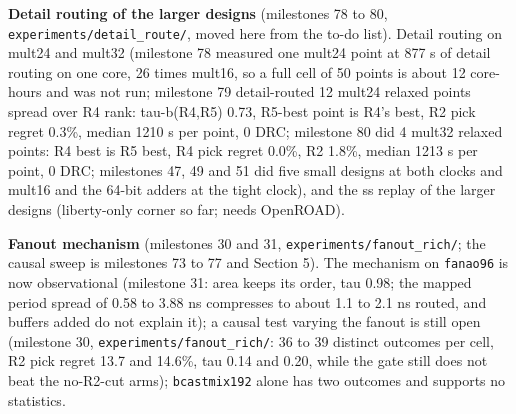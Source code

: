 \documentclass[conference]{IEEEtran}
\begin{document}
\textbf{Detail routing of the larger designs} (milestones 78 to 80,
\texttt{experiments/\allowbreak{}detail\_\allowbreak{}route/\allowbreak{}}, moved here from the to-do list).
Detail routing on mult24 and mult32 (milestone 78 measured one mult24
point at 877 s of detail routing on one core, 26 times mult16, so a full
cell of 50 points is about 12 core-hours and was not run; milestone 79
detail-routed 12 mult24 relaxed points spread over R4 rank: tau-b(R4,R5)
0.73, R5-best point is R4's best, R2 pick regret 0.3\%, median 1210 s
per point, 0 DRC; milestone 80 did 4 mult32 relaxed points: R4 best is
R5 best, R4 pick regret 0.0\%, R2 1.8\%, median 1213 s per point, 0 DRC;
milestones 47, 49 and 51 did five small designs at both clocks and
mult16 and the 64-bit adders at the tight clock), and the ss replay of
the larger designs (liberty-only corner so far; needs OpenROAD).

\textbf{Fanout mechanism} (milestones 30 and 31,
\texttt{experiments/\allowbreak{}fanout\_\allowbreak{}rich/\allowbreak{}}; the causal sweep is milestones 73 to
77 and Section 5). The mechanism on \texttt{fanao96} is now
observational (milestone 31: area keeps its order, tau 0.98; the mapped
period spread of 0.58 to 3.88 ns compresses to about 1.1 to 2.1 ns
routed, and buffers added do not explain it); a causal test varying the
fanout is still open (milestone 30, \texttt{experiments/\allowbreak{}fanout\_\allowbreak{}rich/\allowbreak{}}:
36 to 39 distinct outcomes per cell, R2 pick regret 13.7 and 14.6\%, tau
0.14 and 0.20, while the gate still does not beat the no-R2-cut arms);
\texttt{bcastmix192} alone has two outcomes and supports no statistics.
\end{document}
